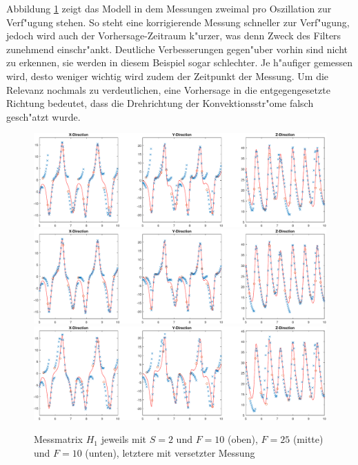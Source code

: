 \begin{refsection}
Abbildung \ref{kalman:H1S2} zeigt das Modell in dem Messungen zweimal pro Oszillation zur Verf"ugung stehen. So steht eine korrigierende Messung schneller zur Verf"ugung, jedoch wird auch der Vorhersage-Zeitraum k"urzer, was denn Zweck des Filters zunehmend einschr"ankt. Deutliche Verbesserungen gegen"uber vorhin sind nicht zu erkennen, sie werden in diesem Beispiel sogar schlechter. Je h"aufiger gemessen wird, desto weniger wichtig wird zudem der Zeitpunkt der Messung.
Um die Relevanz nochmals zu verdeutlichen, eine Vorhersage in die entgegengesetzte Richtung bedeutet, dass die Drehrichtung  der Konvektionsstr"ome falsch gesch"atzt wurde.
\begin{figure}
\centering
\includegraphics[width=\hsize]{kalman/figures/H1R10S2.pdf}
\includegraphics[width=\hsize]{kalman/figures/H1R25S2.pdf}
\includegraphics[width=\hsize]{kalman/figures/H1R10S2aS.pdf}
\caption{Messmatrix $H_{1}$ jeweils mit $S=2$ und $F=10$ (oben), $F=25$ (mitte) und $F=10$ (unten), letztere mit versetzter Messung}
\label{kalman:H1S2}
\end{figure}


\end{refsection}
